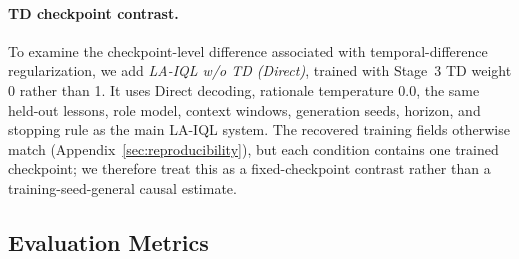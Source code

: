 \documentclass[manuscript,review,anonymous]{acmart}
\begin{document}
\paragraph{TD checkpoint contrast.}
To examine the checkpoint-level difference associated with temporal-difference
regularization, we add \emph{LA-IQL w/o TD (Direct)}, trained with Stage~3 TD
weight 0 rather than 1. It uses Direct decoding, rationale temperature 0.0,
the same held-out lessons, role model, context windows, generation seeds,
horizon, and stopping rule as the main LA-IQL system. The recovered training
fields otherwise match (Appendix~\ref{sec:reproducibility}), but each condition
contains one trained checkpoint; we therefore treat this as a fixed-checkpoint
contrast rather than a training-seed-general causal estimate.

\subsection{Evaluation Metrics}
\end{document}
